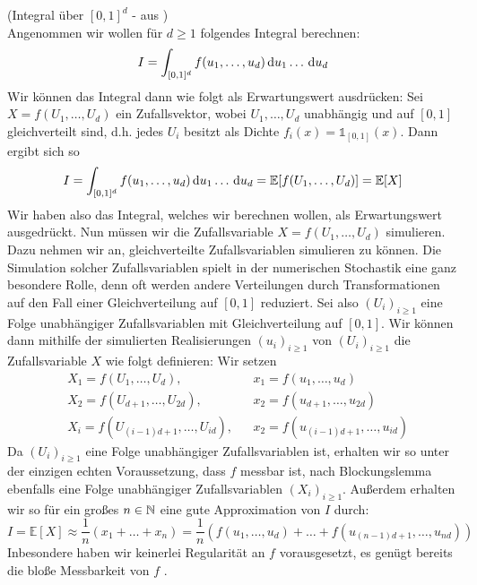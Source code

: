 \begin{Beispiel}(Integral über $ [0,1]^d $ - aus \cite{lapeyre2003introduction})\\
	\label{BeispielIntegral}
	Angenommen wir wollen für $ d \geq 1 $ folgendes Integral berechnen:
	\[
		I = \int_{[0,1]^d} f(u_1,\dots,u_d) \, \mathrm{d} u_1\dots\, \mathrm{d} u_d
	\]
	Wir können das Integral dann wie folgt als Erwartungswert ausdrücken:
	Sei $ X = f(U_1,\dots,U_d) $ ein 
	Zufallsvektor, wobei $ U_1,\dots,U_d $ unabhängig und auf $ [0,1] $ gleichverteilt sind, d.h. jedes $ U_i $ besitzt als Dichte $ f_i(x) = \mathds{1}_{[0,1]}(x) $.
	Dann ergibt sich so 
	\[
		I = \int_{[0,1]^d} f(u_1,\dots,u_d) \, \mathrm{d} u_1\dots\, \mathrm{d} u_d = \mathbb{E}[f(U_1,\dots,U_d)] = \mathbb{E}[X]
	\]
	Wir haben also das Integral, welches wir berechnen wollen, als Erwartungswert ausgedrückt. Nun müssen wir die Zufallsvariable $ X = f(U_1,\dots,U_d) $ simulieren.
	Dazu nehmen wir an, gleichverteilte Zufallsvariablen simulieren zu können. Die Simulation solcher Zufallsvariablen spielt in der numerischen Stochastik eine ganz besondere Rolle, denn oft werden andere Verteilungen durch Transformationen auf den Fall einer Gleichverteilung auf $ [0,1] $ reduziert.
	Sei also $ (U_i)_{i \geq 1} $ eine Folge unabhängiger Zufallsvariablen mit Gleichverteilung auf $ [0,1] $. Wir können dann mithilfe der simulierten Realisierungen $ (u_i)_{i \geq 1} $  von $ (U_i)_{i \geq 1} $ die Zufallsvariable $ X $ wie folgt definieren: Wir setzen
	\begin{align*}
		&X_1 = f(U_1,\dots,U_d), & &x_1 = f(u_1,\dots,u_d) \\
		&X_2 = f(U_{d+1},\dots,U_{2d}), & &x_2 = f(u_{d+1},\dots,u_{2d}) \\
		&X_i = f(U_{(i-1)d+1},\dots,U_{id}), & &x_2 = f(u_{(i-1)d+1},\dots,u_{id})
	\end{align*}
	Da $ (U_i)_{i \geq 1} $ eine Folge unabhängiger Zufallsvariablen ist, erhalten wir so unter der einzigen echten Voraussetzung, dass $ f $ messbar ist, nach Blockungslemma ebenfalls eine Folge unabhängiger Zufallsvariablen $ (X_i)_{i \geq 1} $.
	Außerdem erhalten wir so für ein großes $ n \in \mathbb{N} $ eine gute Approximation von $ I $ durch:
	\[
		I = \mathbb{E}[X] \approx \frac{1}{n}(x_1+\dots+x_n) = \frac{1}{n} (f(u_1,\dots,u_d)+\dots+f(u_{(n-1)d+1},\dots,u_{nd}))
	\]	
	Inbesondere haben wir keinerlei Regularität an $ f $ vorausgesetzt, es genügt bereits die bloße Messbarkeit von $ f $ .
\end{Beispiel}



